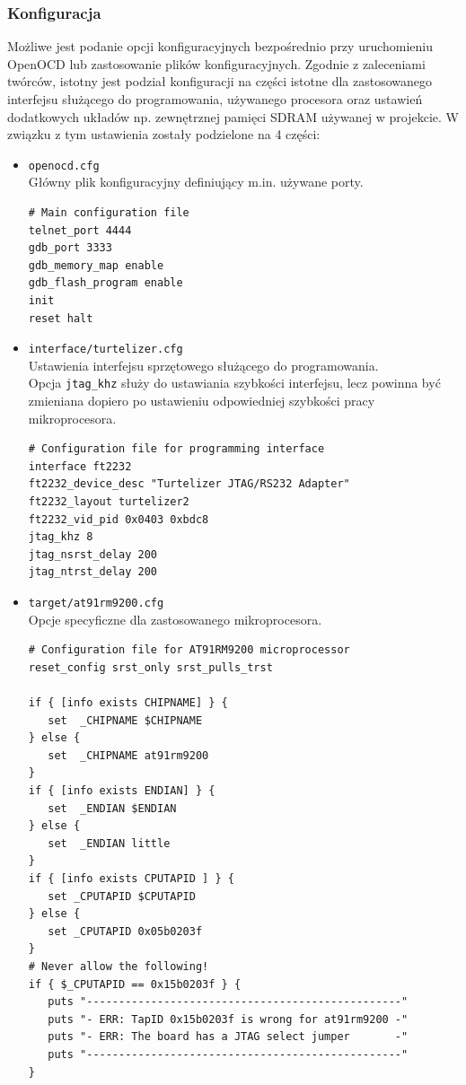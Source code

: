 \documentclass[a4paper,12pt]{book}
\begin{document}
				\subsubsection{Konfiguracja}
					Możliwe jest podanie opcji konfiguracyjnych bezpośrednio przy uruchomieniu OpenOCD lub zastosowanie plików konfiguracyjnych. Zgodnie z zaleceniami twórców, istotny jest podział konfiguracji na części istotne dla zastosowanego interfejsu służącego do programowania, używanego procesora oraz ustawień dodatkowych układów np. zewnętrznej pamięci SDRAM używanej w projekcie. W związku z tym ustawienia zostały podzielone na 4 części:
					\begin{itemize}
						\item{\texttt{openocd.cfg}}\\
							Główny plik konfiguracyjny definiujący m.in. używane porty.
							\begin{lstlisting}[basicstyle={\footnotesize\ttfamily}]
# Main configuration file
telnet_port 4444
gdb_port 3333
gdb_memory_map enable
gdb_flash_program enable
init
reset halt
							\end{lstlisting}
						\item{\texttt{interface/turtelizer.cfg}}\\
							Ustawienia interfejsu sprzętowego służącego do programowania.\\
							Opcja \texttt{jtag\_khz} służy do ustawiania szybkości interfejsu, lecz powinna być zmieniana dopiero po ustawieniu odpowiedniej szybkości pracy mikroprocesora.
							\begin{lstlisting}[basicstyle={\footnotesize\ttfamily}]
# Configuration file for programming interface
interface ft2232
ft2232_device_desc "Turtelizer JTAG/RS232 Adapter"
ft2232_layout turtelizer2
ft2232_vid_pid 0x0403 0xbdc8			
jtag_khz 8
jtag_nsrst_delay 200
jtag_ntrst_delay 200
							\end{lstlisting}
						\item{\texttt{target/at91rm9200.cfg}}\\
							Opcje specyficzne dla zastosowanego mikroprocesora.
							\begin{lstlisting}[basicstyle={\footnotesize\ttfamily}]
# Configuration file for AT91RM9200 microprocessor
reset_config srst_only srst_pulls_trst

if { [info exists CHIPNAME] } {
   set  _CHIPNAME $CHIPNAME
} else {
   set  _CHIPNAME at91rm9200
}
if { [info exists ENDIAN] } {
   set  _ENDIAN $ENDIAN
} else {
   set  _ENDIAN little
}
if { [info exists CPUTAPID ] } {
   set _CPUTAPID $CPUTAPID
} else {
   set _CPUTAPID 0x05b0203f
}
# Never allow the following!
if { $_CPUTAPID == 0x15b0203f } {
   puts "-------------------------------------------------"
   puts "- ERR: TapID 0x15b0203f is wrong for at91rm9200 -"
   puts "- ERR: The board has a JTAG select jumper       -"
   puts "-------------------------------------------------"
}


\end{lstlisting}
\end{itemize}
\end{document}
